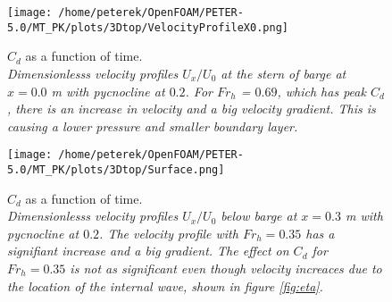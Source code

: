 \documentclass[a4paper, 12pt]{report}
\begin{document}
\begin{minipage}[t]{.45\textwidth}
	\begin{figure}[H]
		\centering
		\texttt{[image: /home/peterek/OpenFOAM/PETER-5.0/MT\_PK/plots/3Dtop/VelocityProfileX0.png]}
		\caption{$C_d$ as a function of time. \\ \textit{Dimensionlesss velocity profiles $U_x/U_0$ at the stern of barge at $x = 0.0$ m with pycnocline at $ 0.2$. For $Fr_h$ = $0.69$, which has peak $C_d$, there is an increase in velocity and a big velocity gradient. This is causing a lower pressure and smaller boundary layer.}}
		\label{fig:convTestIf02U016}
	\end{figure}
\end{minipage}\hfill
\vspace{2ex}
\begin{minipage}[t]{.45\textwidth} 
	\begin{figure}[H]
		\centering
		\texttt{[image: /home/peterek/OpenFOAM/PETER-5.0/MT\_PK/plots/3Dtop/Surface.png]}
		\caption{$C_d$ as a function of time. \\ \textit{Dimensionlesss velocity profiles $U_x/U_0$ below barge at $x = 0.3$ m with pycnocline at $ 0.2$. The velocity profile with $Fr_h = 0.35$ has a signifiant increase and a big gradient. The effect on $C_d$ for $Fr_h = 0.35$ is not as significant even though velocity increaces due to the location of the internal wave, shown in figure \ref{fig:eta}.  }}
		\label{fig:convTestIf02U022}
	\end{figure}
\end{minipage}\hfill
\vspace{2ex}
\end{document}
